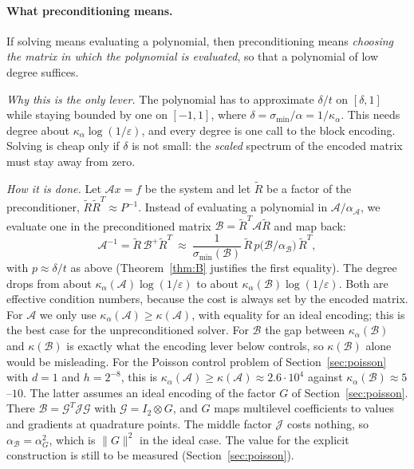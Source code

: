 \documentclass[11pt,a4paper]{article}
\newcommand{\A}{\mathcal{A}}
\newcommand{\B}{\mathcal{B}}
\newcommand{\G}{\mathcal{G}}
\newcommand{\J}{\mathcal{J}}
\newcommand{\Rt}{\widetilde R}
\theoremstyle{remark}
\begin{document}
\paragraph{What preconditioning means.} If solving means evaluating a
polynomial, then preconditioning means \emph{choosing the matrix in which the
polynomial is evaluated}, so that a polynomial of low degree suffices.

\emph{Why this is the only lever.} The polynomial has to approximate $\delta/t$
on $[\delta,1]$ while staying bounded by one on $[-1,1]$, where $\delta=\sigma_{\min}/\alpha=1/\kappa_\alpha$.
This needs degree about $\kappa_\alpha\log(1/\varepsilon)$, and every degree is one call to
the block encoding. Solving is cheap only if $\delta$ is not small: the
\emph{scaled} spectrum of the encoded matrix must stay away from zero.

\emph{How it is done.} Let $\A x=f$ be the system and let $\Rt$ be a factor of
the preconditioner, $\Rt\Rt^T\approx P^{-1}$. Instead of evaluating a polynomial in
$\A/\alpha_\A$, we evaluate one in the preconditioned matrix $\B=\Rt^T\A\Rt$ and map
back:
\[
\A^{-1}=\Rt\,\B^+\Rt^T\ \approx\ \frac1{\sigma_{\min}(\B)}\,\Rt\,p\big(\B/\alpha_\B\big)\,\Rt^T,
\]
with $p\approx\delta/t$ as above (Theorem~\ref{thm:B} justifies the first equality).
The degree drops from about $\kappa_\alpha(\A)\log(1/\varepsilon)$ to about $\kappa_\alpha(\B)\log(1/\varepsilon)$.
Both are effective condition numbers, because the cost is always set by
the encoded matrix. For $\A$ we only use $\kappa_\alpha(\A)\ge\kappa(\A)$, with equality for an
ideal encoding; this is the best case for the unpreconditioned solver. For
$\B$ the gap between $\kappa_\alpha(\B)$ and $\kappa(\B)$ is exactly what the encoding lever
below controls, so $\kappa(\B)$ alone would be misleading. For
the Poisson control problem of Section~\ref{sec:poisson} with $d=1$ and
$h=2^{-8}$, this is $\kappa_\alpha(\A)\ge\kappa(\A)\approx2.6\cdot10^4$ against $\kappa_\alpha(\B)\approx5$--$10$. The
latter assumes an ideal encoding of the factor $G$ of
Section~\ref{sec:poisson}. There $\B=\G^T\J\G$ with $\G=I_2\otimes G$, and $G$ maps
multilevel coefficients to values and gradients at quadrature points. The
middle factor $\J$ costs nothing, so $\alpha_\B=\alpha_G^2$, which is $\|G\|^2$ in the ideal
case. The value for the explicit construction is still to be measured
(Section~\ref{sec:poisson}).
\end{document}
